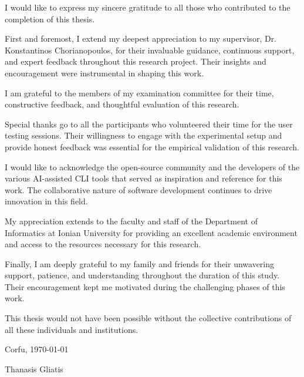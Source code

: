 I would like to express my sincere gratitude to all those who contributed to the completion of this thesis.

First and foremost, I extend my deepest appreciation to my supervisor, Dr. Konstantinos Chorianopoulos, for their invaluable guidance, continuous support, and expert feedback throughout this research project. Their insights and encouragement were instrumental in shaping this work.

I am grateful to the members of my examination committee for their time, constructive feedback, and thoughtful evaluation of this research.

Special thanks go to all the participants who volunteered their time for the user testing sessions. Their willingness to engage with the experimental setup and provide honest feedback was essential for the empirical validation of this research.

I would like to acknowledge the open-source community and the developers of the various AI-assisted CLI tools that served as inspiration and reference for this work. The collaborative nature of software development continues to drive innovation in this field.

My appreciation extends to the faculty and staff of the Department of Informatics at Ionian University for providing an excellent academic environment and access to the resources necessary for this research.

Finally, I am deeply grateful to my family and friends for their unwavering support, patience, and understanding throughout the duration of this study. Their encouragement kept me motivated during the challenging phases of this work.

This thesis would not have been possible without the collective contributions of all these individuals and institutions.

\bigskip

\noindent Corfu, \today

\noindent Thanasis Gliatis

